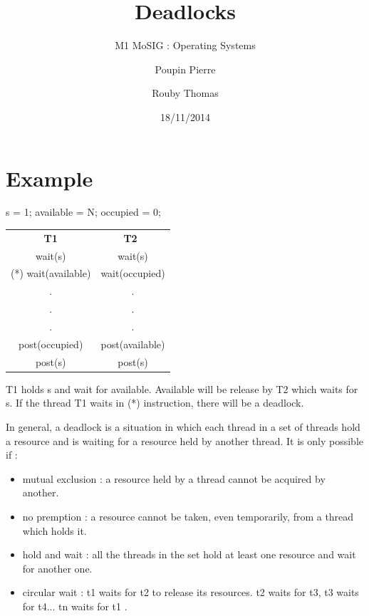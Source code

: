 \documentclass[a4paper,10pt]{article}
\title{\textbf{Deadlocks}}
\subtitle{M1 MoSIG : Operating Systems}
\author{Poupin Pierre \and Rouby Thomas}
\date{18/11/2014}
\begin{document}
\maketitle

\section{Example}

  \begin{center}
  s = 1;
  available = N;
  occupied = 0;
  
    \begin{tabular}{cc}
     \textbf{T1} & \textbf{T2} \\
      wait(s) & wait(s)\\
     (*) wait(available) & wait(occupied) \\
      . & . \\
      . & . \\
      . & . \\
      post(occupied) & post(available) \\
      post(s) & post(s) \\
    \end{tabular}
  \end{center}

T1 holds s and wait for available. Available will be release by T2 which waits for s.
If the thread T1 waits in (*) instruction, there will be a deadlock.

In general, a deadlock is a situation in which each thread in a set of threads hold a resource and is waiting for a resource held by another thread.
It is only possible if :
\begin{itemize}
  \item mutual exclusion : a resource held by a thread cannot be acquired by another.
  \item no premption : a resource cannot be taken, even temporarily, from a thread which holds it.
  \item hold and wait : all the threads in the set hold at least one resource and wait for another one.
  \item circular wait : t1 waits for t2 to release its resources. t2 waits for t3, t3 waits for t4... tn waits for t1 .
\end{itemize}
\end{document}
